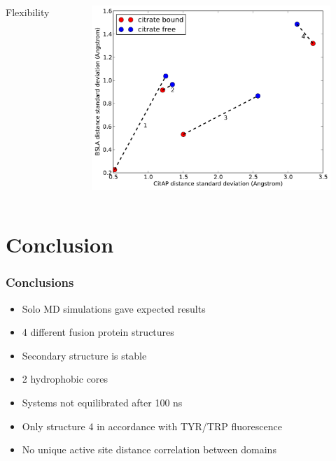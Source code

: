 \documentclass[english]{beamer}
\begin{document}
\begin{frame}
\begin{columns}[]
        \vfill
        \centering
        Flexibility
        \begin{figure}
            \includegraphics[width=\textwidth]{figures/CitAP_BSLA_distance/BSLA_CitAP_analyzed_with_standard_deviation.pdf}  
        \end{figure}      

    \end{columns}    

    \vfill 

\end{frame}        
 

\section{Conclusion}

\begin{frame}
    \frametitle{Conclusions}

    \begin{itemize}
        \item<1-> Solo MD simulations gave expected results
        \item<2-> 4 different fusion protein structures
        \item<3-> Secondary structure is stable
        \item<4-> 2 hydrophobic cores
        \item<5-> Systems not equilibrated after 100 ns
        \item<6-> Only structure 4 in accordance with TYR/TRP fluorescence
        \item<7-> No unique active site distance correlation between domains
    \end{itemize}

\end{frame}        
\end{document}
